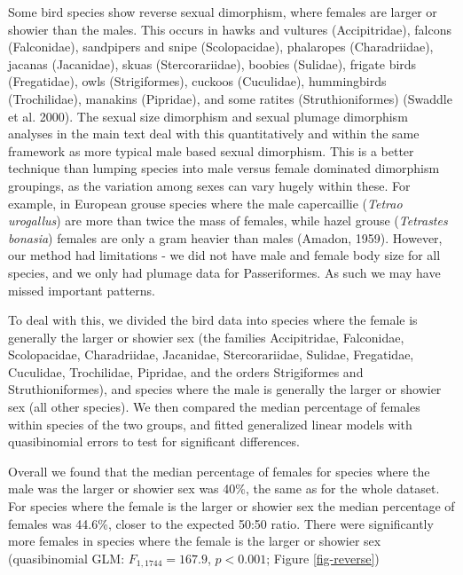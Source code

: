 \documentclass[a4paper, 12pt]{article}
\begin{document}
Some bird species show reverse sexual dimorphism, where females are larger or showier than the males. 
This occurs in hawks and vultures (Accipitridae), falcons (Falconidae), sandpipers and snipe (Scolopacidae), phalaropes (Charadriidae), jacanas (Jacanidae), skuas (Stercorariidae), boobies (Sulidae), frigate birds (Fregatidae), owls (Strigiformes), cuckoos (Cuculidae), hummingbirds (Trochilidae), manakins (Pipridae), and some ratites (Struthioniformes) (Swaddle et al. 2000\cite{swaddle2000novel}). 
The sexual size dimorphism and sexual plumage dimorphism analyses in the main text deal with this quantitatively and within the same framework as more typical male based sexual dimorphism. 
This is a better technique than lumping species into male versus female dominated dimorphism groupings, as the variation among sexes can vary hugely within these. 
For example, in European grouse species where the male capercaillie (\textit{Tetrao urogallus}) are more than twice the mass of females, while hazel grouse (\textit{Tetrastes bonasia}) females are only a gram heavier than males (Amadon, 1959\cite{amadon59}). 
However, our method had limitations - we did not have male and female body size for all species, and we only had plumage data for Passeriformes. 
As such we may have missed important patterns.

To deal with this, we divided the bird data into species where the female is generally the larger or showier sex (the families  Accipitridae, Falconidae, Scolopacidae, Charadriidae, Jacanidae, Stercorariidae, Sulidae, Fregatidae, Cuculidae, Trochilidae, Pipridae, and the orders Strigiformes and Struthioniformes), and species where the male is generally the larger or showier sex (all other species). We then compared the median percentage of females within species of the two groups, and fitted generalized linear models with quasibinomial errors to test for significant differences. 

Overall we found that the median percentage of females for species where the male was the larger or showier sex was 40\%, the same as for the whole dataset. 
For species where the female is the larger or showier sex the median percentage of females was 44.6\%, closer to the expected 50:50 ratio. 
There were significantly more females in species where the female is the larger or showier sex (quasibinomial GLM: $F_{1,1744} = 167.9$, $p < 0.001$; Figure \ref{fig-reverse})
\end{document}
